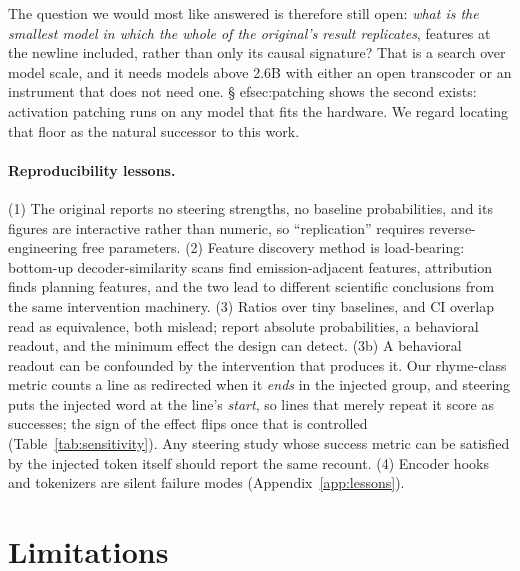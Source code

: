 \documentclass[11pt]{article}
\begin{document}
The question we would most like answered is therefore still open: \emph{what is the smallest model in which the whole of the original's result replicates}, features at the newline included, rather than only its causal signature? That is a search over model scale, and it needs models above 2.6B with either an open transcoder or an instrument that does not need one. \S
ef{sec:patching} shows the second exists: activation patching runs on any model that fits the hardware. We regard locating that floor as the natural successor to this work.

\paragraph{Reproducibility lessons.}
(1) The original reports no steering strengths, no baseline probabilities, and its figures are interactive rather than numeric, so ``replication'' requires reverse-engineering free parameters. (2) Feature discovery method is load-bearing: bottom-up decoder-similarity scans find emission-adjacent features, attribution finds planning features, and the two lead to different scientific conclusions from the same intervention machinery. (3) Ratios over tiny baselines, and CI overlap read as equivalence, both mislead; report absolute probabilities, a behavioral readout, and the minimum effect the design can detect. (3b) A behavioral readout can be confounded by the intervention that produces it. Our rhyme-class metric counts a line as redirected when it \emph{ends} in the injected group, and steering puts the injected word at the line's \emph{start}, so lines that merely repeat it score as successes; the sign of the effect flips once that is controlled (Table~\ref{tab:sensitivity}). Any steering study whose success metric can be satisfied by the injected token itself should report the same recount. (4) Encoder hooks and tokenizers are silent failure modes (Appendix~\ref{app:lessons}).

\section*{Limitations}
\end{document}
